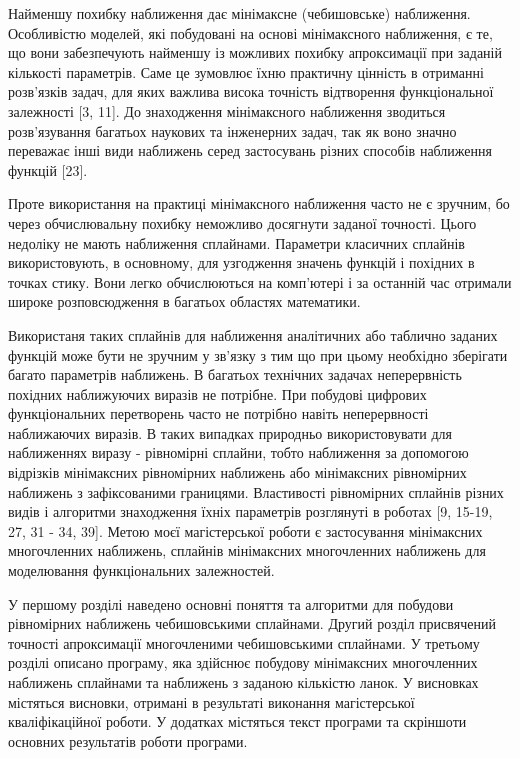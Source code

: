 \documentclass[ukrainian,14pt]{extarticle}
\begin{document}
Найменшу похибку наближення дає мінімаксне (чебишовське) наближення. 
Особливістю моделей, які побудовані на основі мінімаксного наближення, 
є те, що вони забезпечують найменшу із можливих похибку апроксимації при заданій кількості параметрів. 
Саме це зумовлює їхню практичну цінність в отриманні розв’язків задач, 
для яких важлива висока точність відтворення функціональної залежності [3, 11]. 
До знаходження мінімаксного наближення зводиться розв’язування багатьох наукових та інженерних задач, 
так як воно значно переважає інші види наближень серед застосувань різних способів наближення функцій [23]. 

Проте використання на практиці мінімаксного наближення часто не є зручним, 
бо через обчислювальну похибку неможливо досягнути заданої точності. 
Цього недоліку не мають наближення сплайнами. 
Параметри класичних сплайнів використовують, в основному, 
для узгодження значень функцій і похідних в точках стику. 
Вони легко обчислюються на комп'ютері і за останній час отримали широке розповсюдження 
в багатьох областях математики.

Використаня таких сплайнів для наближення аналітичних або таблично заданих функцій 
може бути не зручним у зв'язку з тим що при цьому необхідно зберігати багато параметрів наближень. 
В багатьох технічних задачах неперервність похідних наближуючих виразів не потрібне. 
При побудові цифрових функціональних перетворень часто не потрібно навіть 
неперервності наближаючих виразів.
В таких випадках природньо використовувати для наближеннях виразу - рівномірні сплайни, тобто наближення за допомогою відрізків мінімаксних рівномірних наближень або мінімаксних рівномірних наближень з зафіксованими границями. 
Властивості рівномірних сплайнів різних видів і алгоритми знаходження їхніх параметрів розглянуті в роботах [9, 15-19, 27, 31 - 34, 39].
Метою моєї магістерської роботи є застосування мінімаксних многочленних наближень, сплайнів мінімаксних многочленних наближень для моделювання функціональних залежностей.

У першому розділі наведено основні поняття та алгоритми для побудови рівномірних наближень чебишовськими сплайнами.
Другий розділ присвячений точності апроксимації многочленими чебишовськими сплайнами.
У третьому розділі описано програму, яка здійснює побудову мінімаксних многочленних наближень сплайнами та наближень з заданою кількістю ланок.
У висновках містяться висновки, отримані в результаті виконання магістерської кваліфікаційної роботи. 
У додатках містяться текст програми та скріншоти основних результатів роботи програми.
\end{document}
